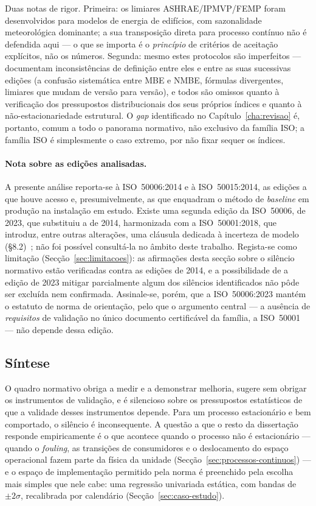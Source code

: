 Duas notas de rigor. Primeira: os limiares ASHRAE/IPMVP/FEMP foram desenvolvidos para modelos de energia de edifícios, com sazonalidade meteorológica dominante; a sua transposição direta para processo contínuo não é defendida aqui --- o que se importa é o \emph{princípio} de critérios de aceitação explícitos, não os números. Segunda: mesmo estes protocolos são imperfeitos --- \textcite{RuizBandera2017} documentam inconsistências de definição entre eles e entre as suas sucessivas edições (a confusão sistemática entre MBE e NMBE, fórmulas divergentes, limiares que mudam de versão para versão), e todos são omissos quanto à verificação dos pressupostos distribucionais dos seus próprios índices e quanto à não-estacionariedade estrutural. O \emph{gap} identificado no Capítulo~\ref{cha:revisao} é, portanto, comum a todo o panorama normativo, não exclusivo da família ISO; a família ISO é simplesmente o caso extremo, por não fixar sequer os índices.

\paragraph{Nota sobre as edições analisadas.} A presente análise reporta-se à ISO~50006:2014 e à ISO~50015:2014, as edições a que houve acesso e, presumivelmente, as que enquadram o método de \emph{baseline} em produção na instalação em estudo. Existe uma segunda edição da ISO~50006, de 2023, que substituiu a de 2014, harmonizada com a ISO~50001:2018, que introduz, entre outras alterações, uma cláusula dedicada à incerteza de modelo (\S8.2)~\cite{ISO50006_2023}; não foi possível consultá-la no âmbito deste trabalho. Regista-se como limitação (Secção~\ref{sec:limitacoes}): as afirmações desta secção sobre o silêncio normativo estão verificadas contra as edições de 2014, e a possibilidade de a edição de 2023 mitigar parcialmente algum dos silêncios identificados não pôde ser excluída nem confirmada. Assinale-se, porém, que a ISO~50006:2023 mantém o estatuto de norma de orientação, pelo que o argumento central --- a ausência de \emph{requisitos} de validação no único documento certificável da família, a ISO~50001 --- não depende dessa edição.

\subsection{Síntese}
\label{sec:assimetria-sintese}

O quadro normativo obriga a medir e a demonstrar melhoria, sugere sem obrigar os instrumentos de validação, e é silencioso sobre os pressupostos estatísticos de que a validade desses instrumentos depende. Para um processo estacionário e bem comportado, o silêncio é inconsequente. A questão a que o resto da dissertação responde empiricamente é o que acontece quando o processo não é estacionário --- quando o \emph{fouling}, as transições de consumidores e o deslocamento do espaço operacional fazem parte da física da unidade (Secção~\ref{sec:processos-continuos}) --- e o espaço de implementação permitido pela norma é preenchido pela escolha mais simples que nele cabe: uma regressão univariada estática, com bandas de $\pm 2\sigma$, recalibrada por calendário (Secção~\ref{sec:caso-estudo}).

